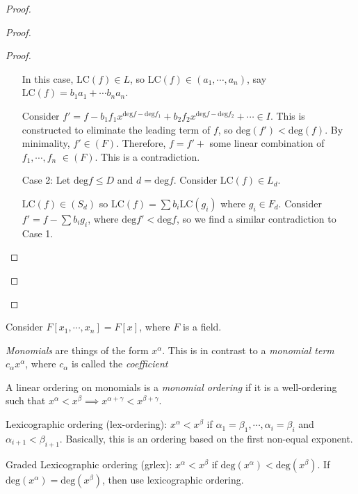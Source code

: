 \documentclass[a4paper,twoside,master.tex]{subfiles}
\begin{document}
\begin{proof}
\begin{proof}
\begin{proof}
\begin{itemize}
                    In this case, $ \text{LC}(f) \in L $, so $ \text{LC}(f) \in (a_1, \cdots, a_n) $, say $ \text{LC}(f) = b_1 a_1 + \cdots b_n a_n $.

                    Consider $ f' = f - b_1 f_1 x^{\text{deg} f - \text{deg} f_1} + b_2 f_2 x^{\text{deg} f - \text{deg} f_2} + \cdots \in I $. This is constructed to eliminate the leading term of $ f $, so $ \text{deg}(f') < \text{deg}(f) $. By minimality, $ f' \in (F) $. Therefore, $ f = f' + $ some linear combination of $ f_1, \cdots, f_n $ $ \in (F) $. This is a contradiction.
                \item[Case 2:] Let $ \text{deg} f \leq D $ and $ d = \text{deg} f $. Consider $ \text{LC}(f) \in L_d $.

                    $ \text{LC}(f) \in (S_d) $ so $ \text{LC}(f) = \sum b_i \text{LC}(g_i) $ where $ g_i \in F_d $. Consider $ f' = f - \sum b_i g_i $, where $ \text{deg} f' < \text{deg} f $, so we find a similar contradiction to Case 1.
            \end{itemize}
        \end{proof}
    \end{proof}
\end{proof}

Consider $ F[x_1, \cdots, x_n] = F[x] $, where $ F $ is a field.
\begin{definition}
    \textit{Monomials} are things of the form $ x^{\alpha} $. This is in contrast to a \textit{monomial term} $ c_{\alpha} x^{\alpha} $, where $ c_{\alpha} $ is called the \textit{coefficient}
\end{definition}
\begin{definition}
    A linear ordering on monomials is a \textit{monomial ordering} if it is a well-ordering such that $ x^{\alpha} < x^{\beta} \implies x^{\alpha + \gamma} < x^{\beta + \gamma} $.
\end{definition}
\begin{ex}
    Lexicographic ordering (lex-ordering): $ x^{\alpha} < x^{\beta} $ if $ \alpha_1 = \beta_1, \cdots, \alpha_i = \beta_i $ and $ \alpha_{i+1} < \beta_{i+1} $. Basically, this is an ordering based on the first non-equal exponent.
\end{ex}
\begin{ex}
    Graded Lexicographic ordering (grlex): $ x^{\alpha} < x^{\beta} $ if $ \text{deg}(x^{\alpha}) < \text{deg}(x^{\beta}) $. If $ \text{deg}(x^{\alpha}) = \text{deg}(x^{\beta}) $, then use lexicographic ordering.
\end{ex}
\end{document}

